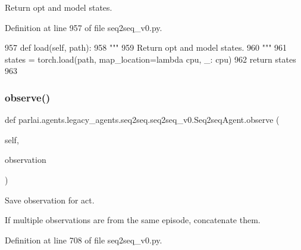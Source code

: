\begin{DoxyVerb}Return opt and model states.
\end{DoxyVerb}
 

Definition at line 957 of file seq2seq\+\_\+v0.\+py.


\begin{DoxyCode}
957     \textcolor{keyword}{def }load(self, path):
958         \textcolor{stringliteral}{"""}
959 \textcolor{stringliteral}{        Return opt and model states.}
960 \textcolor{stringliteral}{        """}
961         states = torch.load(path, map\_location=\textcolor{keyword}{lambda} cpu, \_: cpu)
962         \textcolor{keywordflow}{return} states
963 
\end{DoxyCode}
\mbox{\label{classparlai_1_1agents_1_1legacy__agents_1_1seq2seq_1_1seq2seq__v0_1_1Seq2seqAgent_a8419a9652b14a16cedff86206a7bb613}} 
\subsubsection{\texorpdfstring{observe()}{observe()}}
{\footnotesize\ttfamily def parlai.\+agents.\+legacy\+\_\+agents.\+seq2seq.\+seq2seq\+\_\+v0.\+Seq2seq\+Agent.\+observe (\begin{DoxyParamCaption}\item[{}]{self,  }\item[{}]{observation }\end{DoxyParamCaption})}

\begin{DoxyVerb}Save observation for act.

If multiple observations are from the same episode, concatenate them.
\end{DoxyVerb}
 

Definition at line 708 of file seq2seq\+\_\+v0.\+py.


